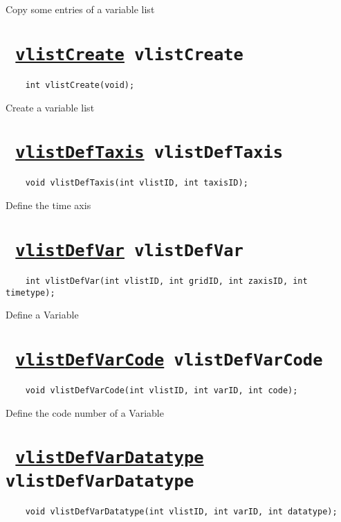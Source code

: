 Copy some entries of a variable list
\ifpdfoutput{}{(\ref{vlistCopyFlag})}


\section*{\texttt{ 
\ifpdf
\hyperref[vlistCreate]{vlistCreate}
\else
vlistCreate
\fi
}}
\begin{verbatim}
    int vlistCreate(void);
\end{verbatim}

Create a variable list
\ifpdfoutput{}{(\ref{vlistCreate})}


\section*{\texttt{ 
\ifpdf
\hyperref[vlistDefTaxis]{vlistDefTaxis}
\else
vlistDefTaxis
\fi
}}
\begin{verbatim}
    void vlistDefTaxis(int vlistID, int taxisID);
\end{verbatim}

Define the time axis
\ifpdfoutput{}{(\ref{vlistDefTaxis})}


\section*{\texttt{ 
\ifpdf
\hyperref[vlistDefVar]{vlistDefVar}
\else
vlistDefVar
\fi
}}
\begin{verbatim}
    int vlistDefVar(int vlistID, int gridID, int zaxisID, int timetype);
\end{verbatim}

Define a Variable
\ifpdfoutput{}{(\ref{vlistDefVar})}


\section*{\texttt{ 
\ifpdf
\hyperref[vlistDefVarCode]{vlistDefVarCode}
\else
vlistDefVarCode
\fi
}}
\begin{verbatim}
    void vlistDefVarCode(int vlistID, int varID, int code);
\end{verbatim}

Define the code number of a Variable
\ifpdfoutput{}{(\ref{vlistDefVarCode})}


\section*{\texttt{ 
\ifpdf
\hyperref[vlistDefVarDatatype]{vlistDefVarDatatype}
\else
vlistDefVarDatatype
\fi
}}
\begin{verbatim}
    void vlistDefVarDatatype(int vlistID, int varID, int datatype);
\end{verbatim}


